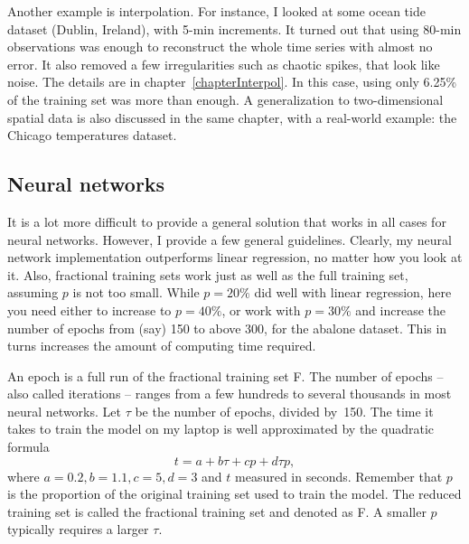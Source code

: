 \documentclass[oneside,10pt]{book}
\begin{document}
Another example is interpolation. For instance, I looked at some ocean tide dataset (Dublin, Ireland), with 5-min increments. It turned out that using 80-min observations was enough to reconstruct the whole time series with almost no error. It also removed a few irregularities such as chaotic spikes, that look like noise. The details are in chapter~\ref{chapterInterpol}. In this case, using only 6.25\% of the training set was more than enough. A generalization to two-dimensional spatial data is also discussed in the same chapter, with a real-world example:  the Chicago temperatures dataset.

\subsection{Neural networks}\label{nnflatulence}

It is a lot more difficult to provide a general solution that works in all cases for neural networks. However, I provide a few general guidelines.
 Clearly, my neural network implementation outperforms linear regression, no matter how you look at it. Also, fractional training sets
 work just as well as the full training set, assuming $p$ is not too small. While $p=20\%$ did well with linear regression, here you need either to increase to $p=40\%$, or work with $p=30\%$ and increase the number of \textcolor{index}{epochs} from (say) 150 to above 300, for the abalone dataset. This in turns increases the amount of computing time required.

An epoch is a full run of the fractional training set F. The number of epochs -- also called iterations -- ranges from a few hundreds to several thousands in most neural networks. Let $\tau$ be the number of epochs, divided by~150. The time it takes to train the model on my laptop is well approximated by the quadratic formula
$$t = a + b \tau + c  p + d  \tau p,$$
where $a=0.2, b = 1.1, c = 5, d = 3$
and  $t$ measured in seconds. Remember that $p$ is the proportion of the original training set used to train the model.
 The reduced training set is called the fractional training set and denoted as F. A smaller $p$ typically requires a larger $\tau$.
\end{document}
